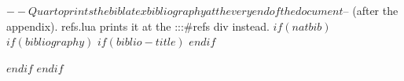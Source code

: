 $-- Quarto prints the biblatex bibliography at the very end of the document
$-- (after the appendix). refs.lua prints it at the :::{#refs} div instead.
$if(natbib)$
$if(bibliography)$
$if(biblio-title)$
\renewcommand\refname{$biblio-title$}
$endif$


$endif$
$endif$
